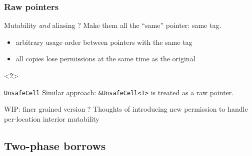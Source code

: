\begin{frame}[t]
    \frametitle{Raw pointers}
    \begin{block}{Mutability \textit{and} aliasing ?}
        Make them all the ``same'' pointer: same tag.
        \begin{itemize}
            \item arbitrary usage order between pointers with the same tag
            \item all copies lose permissions at the same time as the original
        \end{itemize}
    \end{block}

    \begin{onlyenv}<2>
        \begin{block}{\texttt{UnsafeCell}}
            Similar approach: \texttt{\&UnsafeCell<T>} is treated as a raw pointer.
        \end{block}

        \begin{exampleblock}{WIP: finer grained version ?}
            Thoughts of introducing new permission to handle per-location interior mutability
        \end{exampleblock}
    \end{onlyenv}
\end{frame}

\subsection{Two-phase borrows}

